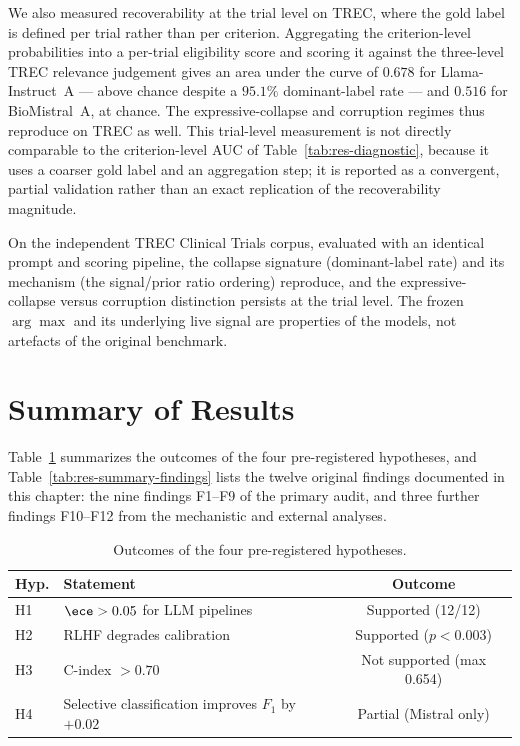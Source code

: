 We also measured recoverability at the trial level on TREC, where the 
gold label is defined per trial rather than per criterion. Aggregating 
the criterion-level probabilities into a per-trial eligibility score and 
scoring it against the three-level TREC relevance judgement gives an area 
under the curve of $0.678$ for Llama-Instruct~A --- above chance despite 
a $95.1\%$ dominant-label rate --- and $0.516$ for BioMistral~A, at 
chance. The expressive-collapse and corruption regimes thus reproduce on 
TREC as well. This trial-level measurement is not directly comparable to 
the criterion-level AUC of Table~\ref{tab:res-diagnostic}, because it 
uses a coarser gold label and an aggregation step; it is reported as a 
convergent, partial validation rather than an exact replication of the 
recoverability magnitude.

\begin{finding}
    On the independent TREC Clinical Trials corpus, evaluated with an 
    identical prompt and scoring pipeline, the collapse signature 
    (dominant-label rate) and its mechanism (the signal/prior ratio 
    ordering) reproduce, and the expressive-collapse versus corruption 
    distinction persists at the trial level. The frozen $\arg\max$ and 
    its underlying live signal are properties of the models, not 
    artefacts of the original benchmark.
\end{finding}
\section{Summary of Results}
\label{sec:res-summary}

Table~\ref{tab:res-summary-hypotheses} summarizes the outcomes of the 
four pre-registered hypotheses, and Table~\ref{tab:res-summary-findings} 
lists the twelve original findings documented in this chapter: the nine 
findings F1--F9 of the primary audit, and three further findings 
F10--F12 from the mechanistic and external analyses.

\begin{table}[htbp]
    \centering
    \caption{Outcomes of the four pre-registered hypotheses.}
    \label{tab:res-summary-hypotheses}
    \small
    \begin{tabular}{@{}lp{7.5cm}c@{}}
        \toprule
        \textbf{Hyp.} & \textbf{Statement} & \textbf{Outcome} \\
        \midrule
        H1 & $\ece > 0.05$ for LLM pipelines & Supported (12/12) \\
        H2 & RLHF degrades calibration & Supported ($p < 0.003$) \\
        H3 & C-index $> 0.70$ & Not supported (max 0.654) \\
        H4 & Selective classification improves $F_1$ by $+0.02$ & Partial (Mistral only) \\
        \bottomrule
    \end{tabular}
\end{table}

